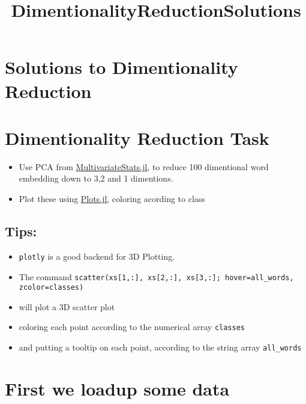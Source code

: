 \documentclass[11pt]{article}
\title{DimentionalityReductionSolutions}
\begin{document}
    
    
    \maketitle
    
    

    
    \section{Solutions to Dimentionality
Reduction}\label{solutions-to-dimentionality-reduction}

\section{Dimentionality Reduction
Task}\label{dimentionality-reduction-task}

\begin{itemize}
\itemsep1pt\parskip0pt
\item
  Use PCA from
  \href{https://github.com/JuliaStats/MultivariateStats.jl}{MultivariateStats.jl},
  to reduce 100 dimentional word embedding down to 3,2 and 1 dimentions.
\item
  Plot these using
  \href{https://github.com/tbreloff/Plots.jl}{Plots.jl}, coloring
  acording to class
\end{itemize}

\subsection{Tips:}\label{tips}

\begin{itemize}
\itemsep1pt\parskip0pt
\item
  \texttt{plotly} is a good backend for 3D Plotting.
\item
  The command
  \texttt{scatter(xs{[}1,:{]}, xs{[}2,:{]}, xs{[}3,:{]}; hover=all\_words, zcolor=classes)}
\item
  will plot a 3D scatter plot
\item
  coloring each point according to the numerical array \texttt{classes}
\item
  and putting a tooltip on each point, according to the string array
  \texttt{all\_words}
\end{itemize}

    \section{First we loadup some data}\label{first-we-loadup-some-data}
\end{document}
